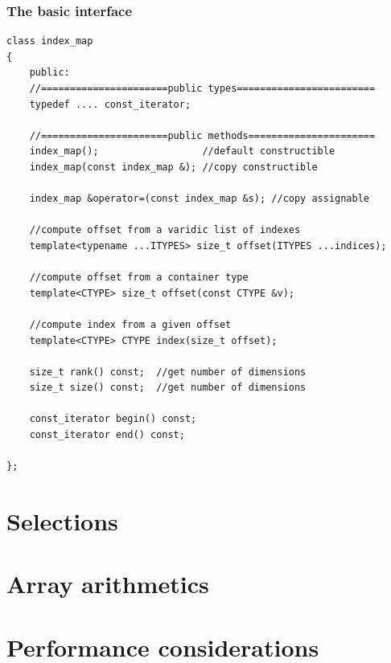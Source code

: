 \subsubsection{The basic interface}

\begin{verbatim}
class index_map
{
    public:
    //======================public types========================
    typedef .... const_iterator;

    //======================public methods======================
    index_map();                  //default constructible
    index_map(const index_map &); //copy constructible 

    index_map &operator=(const index_map &s); //copy assignable 

    //compute offset from a varidic list of indexes
    template<typename ...ITYPES> size_t offset(ITYPES ...indices);

    //compute offset from a container type
    template<CTYPE> size_t offset(const CTYPE &v);

    //compute index from a given offset
    template<CTYPE> CTYPE index(size_t offset);

    size_t rank() const;  //get number of dimensions
    size_t size() const;  //get number of dimensions
    
    const_iterator begin() const; 
    const_iterator end() const; 

};
\end{verbatim}

\section{Selections}

\section{Array arithmetics}

\section{Performance considerations}

